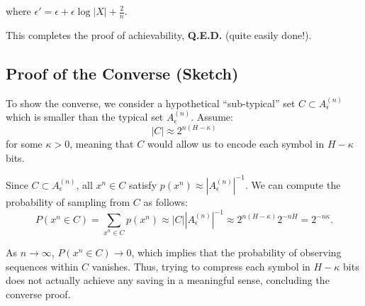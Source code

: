 where \( \epsilon' = \epsilon + \epsilon \log |X| + \frac{2}{n} \).

This completes the proof of achievability, \textbf{Q.E.D.} (quite easily done!).

\subsection{Proof of the Converse (Sketch)}

To show the converse, we consider a hypothetical “sub-typical” set \( C \subset A^{(n)}_\epsilon \) which is smaller than the typical set \( A^{(n)}_\epsilon \). Assume:
\[
    |C| \approx 2^{n(H - \kappa)}
\]
for some \( \kappa > 0 \), meaning that \( C \) would allow us to encode each symbol in \( H - \kappa \) bits.

Since \( C \subset A^{(n)}_\epsilon \), all \( x^n \in C \) satisfy \( p(x^n) \approx |A^{(n)}_\epsilon|^{-1} \). We can compute the probability of sampling from \( C \) as follows:
\[
    P(x^n \in C) = \sum_{x^n \in C} p(x^n) \approx |C| |A^{(n)}_\epsilon|^{-1} \approx 2^{n(H - \kappa)} 2^{-nH} = 2^{-n \kappa}.
\]

As \( n \to \infty \), \( P(x^n \in C) \to 0 \), which implies that the probability of observing sequences within \( C \) vanishes. Thus, trying to compress each symbol in \( H - \kappa \) bits does not actually achieve any saving in a meaningful sense, concluding the converse proof.











  



